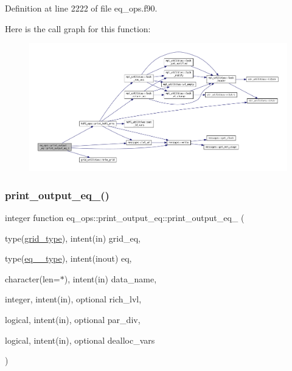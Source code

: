 Definition at line 2222 of file eq\+\_\+ops.\+f90.

Here is the call graph for this function\+:
\nopagebreak
\begin{figure}[H]
\begin{center}
\leavevmode
\includegraphics[width=350pt]{interfaceeq__ops_1_1print__output__eq_a07fef57b633cc1b723405cb07d12ef24_cgraph}
\end{center}
\end{figure}
\mbox{\label{interfaceeq__ops_1_1print__output__eq_a7efa796c3c3e7cdbcb4fb51c9c6afcac}} 
\subsubsection{\texorpdfstring{print\+\_\+output\+\_\+eq\+\_()}{print\_output\_eq\_2()}\hspace{0.1cm}{\footnotesize\ttfamily [1/2]}}
{\footnotesize\ttfamily integer function eq\+\_\+ops\+::print\+\_\+output\+\_\+eq\+::print\+\_\+output\+\_\+eq\+\_ (\begin{DoxyParamCaption}\item[{type(\hyperlink{structgrid__vars_1_1grid__type}{grid\+\_\+type}), intent(in)}]{grid\+\_\+eq,  }\item[{type(\hyperlink{structeq__vars_1_1eq__2__type}{eq\+\_\+2\+\_\+type}), intent(inout)}]{eq,  }\item[{character(len=$\ast$), intent(in)}]{data\+\_\+name,  }\item[{integer, intent(in), optional}]{rich\+\_\+lvl,  }\item[{logical, intent(in), optional}]{par\+\_\+div,  }\item[{logical, intent(in), optional}]{dealloc\+\_\+vars }\end{DoxyParamCaption})}




